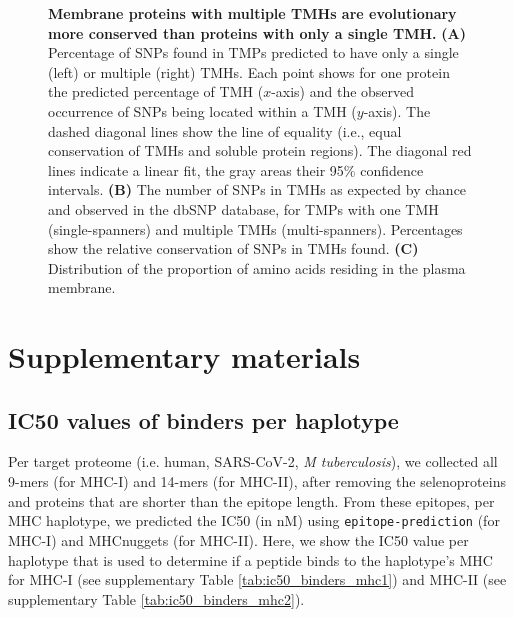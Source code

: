 \begin{figure}[!htbp]
  \caption{ \textbf{Membrane proteins with multiple TMHs are evolutionary more conserved than proteins with only a single TMH.}
      \textbf{(A)} 
      Percentage of SNPs found in TMPs predicted to have only a single
      (left) or multiple (right) TMHs.
      Each point shows for one protein the predicted percentage of TMH ($x$-axis) and the observed occurrence of SNPs being located within a TMH ($y$-axis). The dashed diagonal lines show the line of equality (i.e., equal conservation of TMHs and soluble protein regions). 
      The diagonal red lines indicate a linear fit, the gray areas their 95\% confidence intervals.
      \textbf{(B)} 
      The number of SNPs in TMHs as expected by chance 
      and observed in the dbSNP database, 
      for TMPs with one TMH (single-spanners) and multiple TMHs (multi-spanners).
      Percentages show the relative conservation
      of SNPs in TMHs found.
      \textbf{(C)} 
      Distribution of the proportion of amino acids residing
      in the plasma membrane. 
     }
\end{figure}

\clearpage

\newpage
\appendix
\section{Supplementary materials}

\renewcommand{\thefigure}{S\arabic{figure}}
\setcounter{figure}{0}

\renewcommand{\thetable}{S\arabic{table}}
\setcounter{table}{0}


\subsection{IC50 values of binders per haplotype}
\label{subsec:ic50s_per_haplotype}

Per target proteome (i.e. human, SARS-CoV-2, \emph{M tuberculosis}),
we collected all 9-mers (for MHC-I) and 14-mers (for MHC-II),
after removing the selenoproteins and proteins that are shorter
than the epitope length.
From these epitopes, per MHC haplotype,
we predicted the IC50 (in nM) using \verb;epitope-prediction; (for MHC-I)
and MHCnuggets (for MHC-II). 
Here, we show the IC50 value per haplotype that
is used to determine if a peptide binds to the haplotype's MHC
for MHC-I (see supplementary Table \ref{tab:ic50_binders_mhc1}) and 
MHC-II (see supplementary Table \ref{tab:ic50_binders_mhc2}).

